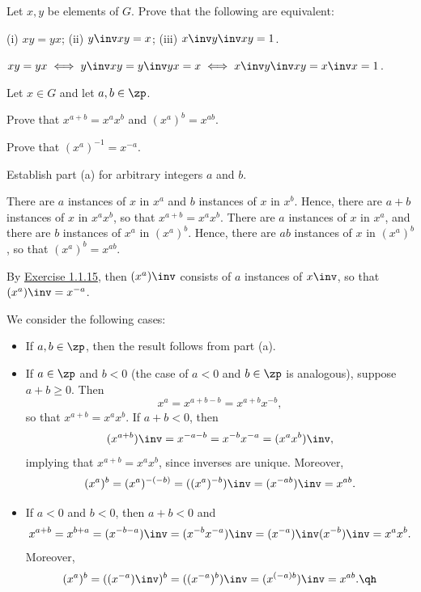 \begin{exercise}\label{ex1.1.18}
    Let $x, y$ be elements of $G$. Prove that the following are equivalent:

    (i) $xy = yx$; \quad (ii) $y\inv xy = x$; \quad (iii) $x\inv y\inv xy = 1$.
\end{exercise}

\begin{sol}
    $xy = yx \iff y\inv xy = y\inv yx = x \iff x\inv y\inv xy = x\inv x = 1$.
\end{sol}

\begin{specialexercise} \label{ex1.1.19}
    Let $x \in G$ and let $a, b \in \zp$.
    \begin{subproblems}
        \item Prove that $x^{a+b} = x^a x^b$ and $(x^a)^b = x^{ab}$.
        \item Prove that $(x^a)^{-1} = x^{-a}$.
        \item Establish part (a) for arbitrary integers $a$ and $b$.
    \end{subproblems}
\end{specialexercise}

\begin{solalph}
    \item There are $a$ instances of $x$ in $x^a$ and $b$ instances of $x$ in $x^b$. Hence, there are $a + b$ instances of $x$ in $x^a x^b$, so that $x^{a+b} = x^a x^b$. There are $a$ instances of $x$ in $x^a$, and there are $b$ instances of $x^a$ in $(x^a)^b$. Hence, there are $ab$ instances of $x$ in $(x^a)^b$, so that $(x^a)^b = x^{ab}$.
    \item By \hyperref[ex1.1.15]{Exercise 1.1.15}, then $(x^a)\inv$ consists of $a$ instances of $x\inv$, so that $(x^a)\inv = x^{-a}$.
    \item We consider the following cases:
    \begin{itemize}
        \item If $a, b \in \zp$, then the result follows from part (a).
        \item If $a \in \zp$ and $b < 0$ (the case of $a < 0$ and $b \in \zp$ is analogous), suppose $a + b \geq 0$. Then
        \[x^a = x^{a + b - b} = x^{a + b}x^{-b},\]
        so that $x^{a + b} = x^a x^b$. If $a + b < 0$, then
        \[(x^{a + b})\inv = x^{-a - b} = x^{-b} x^{-a} = (x^a x^b)\inv,\]
        implying that $x^{a + b} = x^a x^b$, since inverses are unique. Moreover,
        \[(x^a)^b = (x^a)^{-(-b)} = ((x^a)^{-b})\inv = (x^{-ab})\inv = x^{ab}.\]
        \item If $a < 0$ and $b < 0$, then $a + b < 0$ and
        \[x^{a + b} = x^{b + a} = (x^{-b - a})\inv = (x^{-b} x^{-a})\inv = (x^{-a})\inv (x^{-b})\inv = x^a x^b.\]
        Moreover,
        \[(x^a)^b = ((x^{-a})\inv)^b = ((x^{-a})^b)\inv = (x^{(-a)b})\inv = x^{ab}. \qh\]
    \end{itemize}
\end{solalph}

